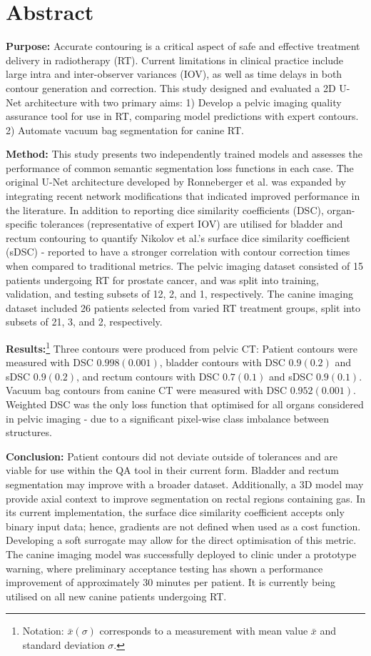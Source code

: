 \chapter{Abstract} \label{ch:abstract}

\textbf{Purpose:} Accurate contouring is a critical aspect of safe and effective
treatment delivery in radiotherapy (RT). Current limitations in clinical
practice include large intra and inter-observer variances (IOV), as well as time
delays in both contour generation and correction. This study designed and
evaluated a 2D U-Net architecture with two primary aims: 1) Develop a pelvic
imaging quality assurance tool for use in RT, comparing model predictions with
expert contours. 2) Automate vacuum bag segmentation for canine RT.

\textbf{Method:} This study presents two independently trained models and
assesses the performance of common semantic segmentation loss functions in each
case. The original U-Net architecture developed by Ronneberger et al. was
expanded by integrating recent network modifications that indicated improved
performance in the literature. In addition to reporting dice similarity
coefficients (DSC), organ-specific tolerances (representative of expert IOV) are
utilised for bladder and rectum contouring to quantify Nikolov et al.'s surface
dice similarity coefficient (sDSC) - reported to have a stronger
correlation with contour correction times when compared to traditional metrics.
The pelvic imaging dataset consisted of 15 patients undergoing RT for prostate
cancer, and was split into training, validation, and testing subsets of 12, 2,
and 1, respectively. The canine imaging dataset included 26 patients selected
from varied RT treatment groups, split into subsets of 21, 3, and 2, respectively.

\textbf{Results:}\footnote{Notation: $\bar{x}(\sigma)$ corresponds to a
measurement with mean value $\bar{x}$ and standard deviation $\sigma$.} Three
contours were produced from pelvic CT: Patient contours were measured with DSC
$0.998(0.001)$, bladder contours with DSC $0.9(0.2)$ and sDSC $0.9(0.2)$, and
rectum contours with DSC $0.7(0.1)$ and sDSC $0.9(0.1)$. Vacuum bag contours
from canine CT were measured with DSC $0.952(0.001)$. Weighted DSC was the only
loss function that optimised for all organs considered in pelvic imaging -
due to a significant pixel-wise class imbalance between structures.

\textbf{Conclusion:} Patient contours did not deviate outside of tolerances and
are viable for use within the QA tool in their current form. Bladder and rectum
segmentation may improve with a broader dataset. Additionally, a 3D model may
provide axial context to improve segmentation on rectal regions containing gas.
In its current implementation, the surface dice similarity coefficient accepts
only binary input data; hence, gradients are not defined when used as a cost
function. Developing a soft surrogate may allow for the direct optimisation of
this metric. The canine imaging model was successfully deployed to clinic under
a prototype warning, where preliminary acceptance testing has shown a
performance improvement of approximately 30 minutes per patient. It is currently
being utilised on all new canine patients undergoing RT.

